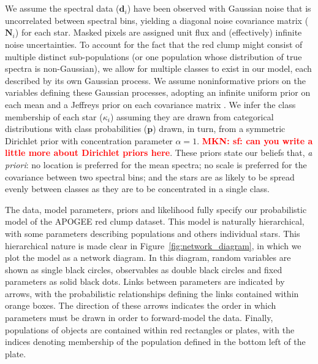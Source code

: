\documentclass[a4paper,fleqn,usenatbib]{mnras}
\newcommand{\classprobs}{{\bm p}}
\newcommand{\objclass}{{\kappa}}
\newcommand{\objdata}{\hat{\bm d}}
\newcommand{\objnoise}{{\bm N}}
\newcommand{\mkn}[1]{\textbf{\textcolor{red}{MKN: #1}}}
\begin{document}
We assume the spectral data ($\objdata_i$) have been observed with Gaussian noise that is uncorrelated between spectral bins, yielding a diagonal noise covariance matrix ($\objnoise_i$) for each star. Masked pixels are assigned unit flux and (effectively) infinite noise uncertainties. To account for the fact that the red clump might consist of multiple distinct sub-populations (or one population whose distribution of true spectra is non-Gaussian), we allow for multiple classes to exist in our model, each described by its own Gaussian process. We assume noninformative priors on the variables defining these Gaussian processes, adopting an infinite uniform prior on each mean and a Jeffreys prior on each covariance matrix \citep[p73]{Gelman_etal:2013}. We infer the class membership of each star ($\objclass_i$) assuming they are drawn from categorical distributions with class probabilities ($\classprobs$) drawn, in turn, from a symmetric Dirichlet prior with concentration parameter $\alpha=1$. \mkn{ sf: can you write a little more about Dirichlet priors here}. These priors state our beliefs that, {\it a priori}: no location is preferred for the mean spectra; no scale is preferred for the covariance between two spectral bins; and the stars are as likely to be spread evenly between classes as they are to be concentrated in a single class.

The data, model parameters, priors and likelihood fully specify our probabilistic model of the APOGEE red clump dataset. This model is naturally hierarchical, with some parameters describing populations and others individual stars. This hierarchical nature is made clear in Figure~\ref{fig:network_diagram}, in which we plot the model as a network diagram. In this diagram, random variables are shown as single black circles, observables as double black circles and fixed parameters as solid black dots. Links between parameters are indicated by arrows, with the probabilistic relationships defining the links contained within orange boxes. The direction of these arrows indicates the order in which parameters must be drawn in order to forward-model the data. Finally, populations of objects are contained within red rectangles or plates, with the indices denoting membership of the population defined in the bottom left of the plate.
\end{document}
